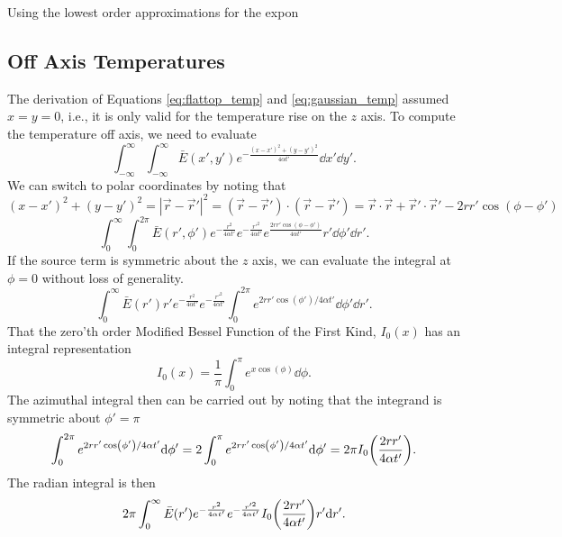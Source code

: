 \documentclass[]{article}
\begin{document}
Using the lowest order approximations for the expon


\subsection{Off Axis Temperatures}
The derivation of Equations \ref{eq:flattop_temp} and \ref{eq:gaussian_temp} assumed $x = y = 0$, i.e., it is only valid for the temperature rise on the $z$ axis.
To compute the temperature off axis, we need to evaluate
\begin{equation*}
  \int_{-\infty}^\infty \int_{-\infty}^\infty \bar{E}(x',y') e^{-\frac{(x-x')^2 + (y-y')^2}{4\alpha t'}} \dd x' \dd y'.
\end{equation*}
We can switch to polar coordinates by noting that $(x-x')^2 + (y-y')^2 = |\vec{r}-\vec{r}'|^2 = (\vec{r}-\vec{r}')\cdot(\vec{r}-\vec{r}') = \vec{r}\cdot\vec{r} + \vec{r}'\cdot\vec{r}' - 2r r' \cos(\phi - \phi')$
\begin{equation*}
  \int_0^\infty \int_0^{2\pi} \bar{E}(r',\phi')  e^{-\frac{r^2}{4\alpha t'}}e^{-\frac{r'^2}{4\alpha t'}}e^{\frac{2rr'\cos(\phi-\phi')}{4\alpha t'}}r' \dd \phi' \dd r'.
\end{equation*}
If the source term is symmetric about the $z$ axis, we can evaluate the integral at $\phi=0$ without loss of generality.
\begin{equation*}
\int_0^\infty \bar{E}(r') r'e^{-\frac{r^2}{4\alpha t'}}e^{-\frac{r'^2}{4\alpha t'}}\int_0^{2\pi} e^{2rr'\cos(\phi')/4\alpha t'} \dd \phi' \dd r'.
\end{equation*}
That the zero'th order Modified Bessel Function of the First Kind, $I_0(x)$ has an integral representation
\begin{equation}
  I_0(x) = \frac{1}{\pi} \int_0^\pi e^{x\cos(\phi)} \dd \phi.
\end{equation}
The azimuthal integral then can be carried out by noting that the integrand is symmetric about $\phi' = \pi$
\begin{equation*}
\int_0^{2\pi}  e^{2rr'\cos(\phi')/4\alpha t'}\dd \phi'
=2\int_0^{\pi}  e^{2rr'\cos(\phi')/4\alpha t'}\dd \phi'
=2\pi I_0\qty(\frac{2rr'}{4\alpha t'}).
\end{equation*}
The radian integral is then
\begin{equation*}
  2\pi \int_0^\infty \bar{E}(r')   e^{-\frac{r^2}{4\alpha t'}}e^{-\frac{r'^2}{4\alpha t'}}I_0\qty(\frac{2rr'}{4\alpha t'}) r'\dd r'.
\end{equation*}
\end{document}
